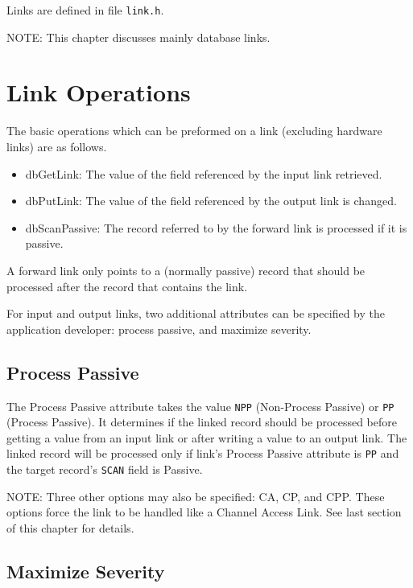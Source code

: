 Links are defined in file \verb|link.h|.

NOTE: This chapter discusses mainly database links.

\section{Link Operations}

The basic operations which can be preformed on a link (excluding hardware links)
are as follows.

\begin{itemize}
\item {}dbGetLink:
The value of the field referenced by the input link retrieved.

\item {}dbPutLink:
The value of the field referenced by the output link is changed.

\item {}dbScanPassive:
The record referred to by the forward link is processed if it is passive.

\end{itemize}

A forward link only points to a (normally passive) record that should be processed after the record that contains the link.

For input and output links, two additional attributes can be specified by the application developer: process passive, and maximize severity.

\subsection{Process Passive}

The Process Passive attribute takes the value \verb|NPP| (Non-Process Passive) or \verb|PP| (Process Passive).
It determines if the linked record should be processed before getting a value from an input link or after writing a value to an output link.
The linked record will be processed only if link's Process Passive attribute is \verb|PP| and the target record's \verb|SCAN| field is Passive.

NOTE: Three other options may also be specified:
CA, CP, and CPP. These options force the link to be handled like a Channel Access Link.
See last section of this chapter for details.

\subsection{Maximize Severity}

